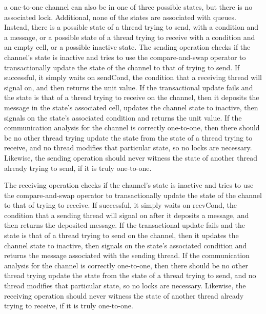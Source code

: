 \documentclass[10pt]{article}
\begin{document}
a one-to-one channel can also be in one of three possible states, but there is no associated
lock. Additional, none of the states are associated with queues.  Instead, there is a possible
state of a thread trying to send, with a condition and a message, or a possible state of a
thread trying to receive with a condition and an empty cell, or a possible inactive state.
The sending operation checks if the channel's state is inactive and tries to use the
compare-and-swap operator to transactionally update the state of the channel to that of
trying to
send.  If successful, it simply waits on sendCond, the condition that a receiving thread will
signal on, and then returns the unit value.  If the transactional update fails and the state is
that of a thread trying to receive on the channel, then it deposits the message in the state's
associated cell, updates the channel state to inactive, then signals on the state's associated
condition and returns the unit value.  If the communication analysis for the channel is
correctly one-to-one, then there should be no other thread trying update the state from the
state of a thread trying to receive, and no thread modifies that particular state, so no locks
are necessary.  Likewise, the sending operation
should never witness the state of another thread
already trying to send, if it is truly one-to-one.

The receiving operation checks if the channel's state is inactive and tries to use the
compare-and-swap operator to transactionally update the state of the channel to that of trying
to receive.  If successful, it simply waits on recvCond, the condition that a sending thread
will signal on after it deposits a message, and then returns the deposited message.  If the
transactional update fails and the state is that of a thread trying to send on the channel,
then it updates the channel state to inactive, then signals on the state's associated
condition and returns the message associated with the sending thread.  If the communication
analysis for the channel is correctly one-to-one, then there should be no other thread trying
update the state from the state of a thread trying to send, and no thread modifies that
particular state, so no locks are necessary.  Likewise, the receiving operation should never
witness the state of another thread already trying to receive, if it is truly one-to-one.
\end{document}
